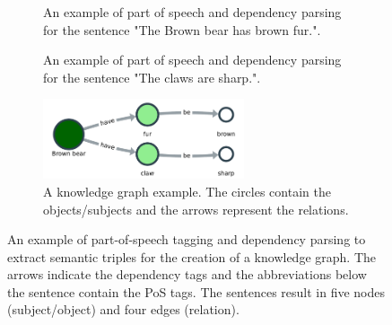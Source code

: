 \documentclass[a4paper, 12pt, oneside]{book} %
\begin{document}
\begin{figure} [htpb]
    \centering
    \begin{subfigure}[b]{1.0\textwidth}
        \centering
        
        \caption[Example of part of speech tagging (1)]{An example of part of speech and dependency parsing for the sentence "The Brown bear has brown fur.".}
        \label{fig:PoS_example}
    \end{subfigure}
    \vfill
    \centering
    \begin{subfigure}[b]{1.0\textwidth}
        \centering
        
        \caption[Example of part of speech tagging (2)]{An example of part of speech and dependency parsing for the sentence "The claws are sharp.".}
        \label{fig:PoS_example2}
    \end{subfigure}
    \vfill
    \begin{subfigure}[b]{1.0\textwidth}
        \centering
        \includegraphics[width=0.65\textwidth]{kn_example_v2.pdf}
        \caption[Example of a knowledge graph]{A knowledge graph example. The circles contain the objects/subjects and the arrows represent the relations.}
        \label{fig:graph_example}    
    \end{subfigure}
    \caption[Part of Speech tagging and dependency parsing]{An example of part-of-speech tagging and dependency parsing to extract semantic triples for the creation of a knowledge graph. The arrows indicate the dependency tags and the abbreviations below the sentence contain the PoS tags. The sentences result in five nodes (subject/object) and four edges (relation). }
    \label{fig:pos_pipeline}
\end{figure}
\end{document}
